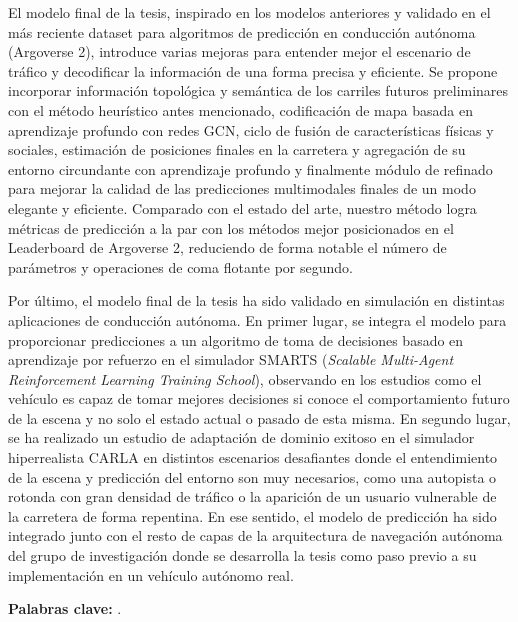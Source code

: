 El modelo final de la tesis, inspirado en los modelos anteriores y validado en el más reciente dataset para algoritmos de predicción en conducción autónoma (Argoverse 2), introduce varias mejoras para entender mejor el escenario de tráfico y decodificar la información de una forma precisa y eficiente. Se propone incorporar información topológica y semántica de los carriles futuros preliminares con el método heurístico antes mencionado, codificación de mapa basada en aprendizaje profundo con redes GCN, ciclo de fusión de características físicas y sociales, estimación de posiciones finales en la carretera y agregación de su entorno circundante con aprendizaje profundo y finalmente módulo de refinado para mejorar la calidad de las predicciones multimodales finales de un modo elegante y eficiente. Comparado con el estado del arte, nuestro método logra métricas de predicción a la par con los métodos mejor posicionados en el Leaderboard de Argoverse 2, reduciendo de forma notable el número de parámetros y operaciones de coma flotante por segundo.

Por último, el modelo final de la tesis ha sido validado en simulación en distintas aplicaciones de conducción autónoma. En primer lugar, se integra el modelo para proporcionar predicciones a un algoritmo de toma de decisiones basado en aprendizaje por refuerzo en el simulador SMARTS (\textit{Scalable Multi-Agent Reinforcement Learning Training School}), observando en los estudios como el vehículo es capaz de tomar mejores decisiones si conoce el comportamiento futuro de la escena y no solo el estado actual o pasado de esta misma. En segundo lugar, se ha realizado un estudio de adaptación de dominio exitoso en el simulador hiperrealista CARLA en distintos escenarios desafiantes donde el entendimiento de la escena y predicción del entorno son muy necesarios, como una autopista o rotonda con gran densidad de tráfico o la aparición de un usuario vulnerable de la carretera de forma repentina. En ese sentido, el modelo de predicción ha sido integrado junto con el resto de capas de la arquitectura de navegación autónoma del grupo de investigación donde se desarrolla la tesis como paso previo a su implementación en un vehículo autónomo real.

\textbf{Palabras clave:} \myThesisKeywords.



